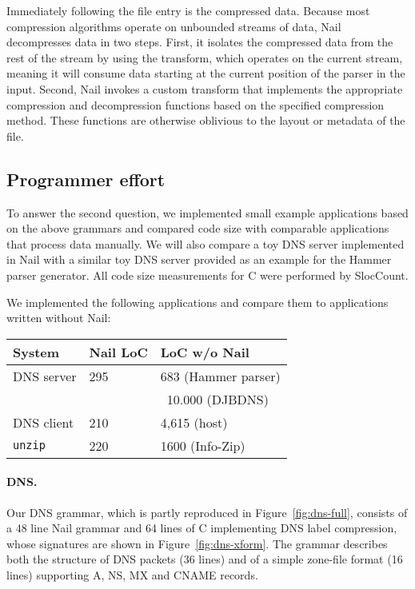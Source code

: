 Immediately following the file entry is the compressed data.  Because
most compression algorithms operate on unbounded streams of data, Nail
decompresses data in two steps.  First, it isolates the compressed
data from the rest of the stream by using the  transform,
which operates on the current stream, meaning it will consume data
starting at the current position of the parser in the input.  Second,
Nail invokes a custom  transform that implements
the appropriate compression and decompression functions based on the
specified compression method. These functions are otherwise oblivious
to the layout or metadata of the file.


\subsection{Programmer effort}


\label{s:eval-effort}
To answer the second question, we implemented small example applications based on the above
grammars and compared code size with comparable applications that process data manually. We will
also compare a toy DNS server implemented in Nail with a similar toy DNS server provided as an
example for the Hammer parser generator. All code size measurements for C were performed by
SlocCount\cite{sloccount}.

\noindent We implemented the following applications and compare them to applications written without
Nail:

\noindent\begin{tabular}{@{}lll@{}} 
\toprule
\textbf{System} & \textbf{Nail LoC}  & \textbf{LoC w/o Nail} \\
\midrule
DNS server & 295 & 683 (Hammer parser)\\
&&  ~10.000 (DJBDNS)\\ 
DNS client & 210  & 4,615 (host) \\
\texttt{unzip} & 220 & 1600 (Info-Zip) \\
\bottomrule
\end{tabular}
\paragraph{DNS.}

Our DNS grammar, which is partly reproduced in Figure~\ref{fig:dns-full}, consists of a 48 line Nail
grammar and 64 lines of C implementing DNS label compression, whose signatures are shown in
Figure~\ref{fig:dns-xform}.
The grammar describes both the structure of DNS packets (36 lines) and of a simple zone-file format
(16 lines) supporting A, NS, MX and CNAME records. 

